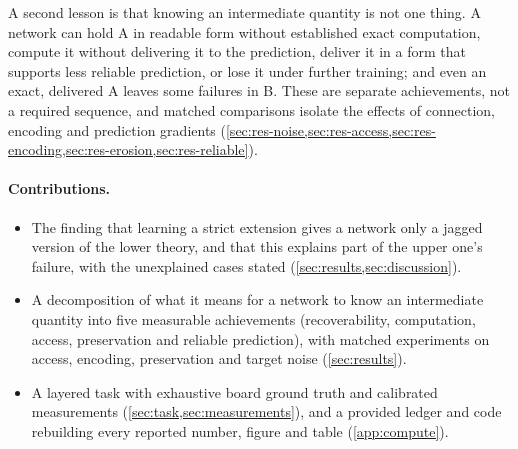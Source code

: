 A second lesson is that knowing an intermediate quantity is not one thing.
A network can hold A in readable form without established exact computation,
compute it without delivering it to the prediction, deliver it in a form that
supports less reliable prediction, or lose it under further training; and
even an exact, delivered A leaves some failures in B. These are separate
achievements, not a required sequence, and matched comparisons isolate the
effects of connection, encoding and prediction gradients
(\cref{sec:res-noise,sec:res-access,sec:res-encoding,sec:res-erosion,sec:res-reliable}).

\paragraph{Contributions.}
\begin{itemize}
\item The finding that learning a strict extension gives a network only a
  jagged version of the lower theory, and that this explains part of
  the upper one's failure, with the unexplained cases stated
  (\cref{sec:results,sec:discussion}).
\item A decomposition of what it means for a network to know an intermediate
  quantity into five measurable achievements (recoverability, computation,
  access, preservation and reliable prediction), with matched experiments on
  access, encoding, preservation and target noise (\cref{sec:results}).
\item A layered task with exhaustive board ground truth and calibrated
  measurements (\cref{sec:task,sec:measurements}), and a provided ledger and
  code rebuilding every reported number, figure and table (\cref{app:compute}).
\end{itemize}
